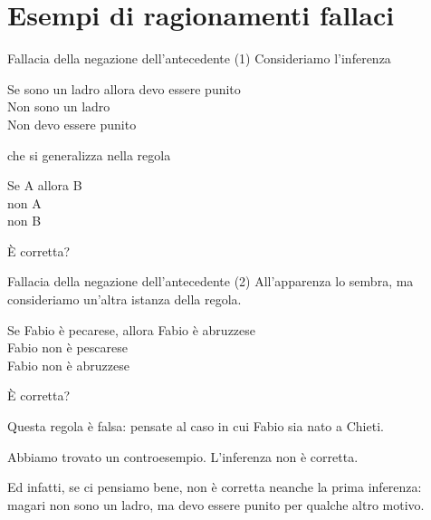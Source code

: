 \documentclass[10pt,dvipsnames]{beamer}
\begin{document}
\section{Esempi di ragionamenti fallaci}

\begin{frame}{Fallacia della negazione dell'antecedente (1)}
	Consideriamo l'inferenza
	\begin{center}
		\begin{inference}
			Se sono un ladro allora devo essere punito\\
			Non sono un ladro\\
			\hline
			Non devo essere punito
		\end{inference}
	\end{center}
	che si generalizza nella regola
	\begin{center}
		\begin{inference}
			Se A allora B\\
			non A\\
			\hline
			non B
		\end{inference}
	\end{center}
	È corretta?
\end{frame}

\begin{frame}{Fallacia della negazione dell'antecedente (2)}
	All'apparenza lo sembra, ma consideriamo un'altra istanza della regola.
	\begin{center}
		\begin{inference}
			Se Fabio è pecarese, allora Fabio è abruzzese \only<3->{\checkmark}\\
			Fabio non è pescarese \only<4->{\checkmark}\\
			\hline
			Fabio non è abruzzese \only<5->{\xmark}
		\end{inference}
	\end{center}
	È corretta?

	\pause
	\medskip
	Questa regola è falsa: pensate al caso in cui Fabio sia nato a Chieti.

	\medskip
	Abbiamo trovato un \alert{controesempio}. L'inferenza non è corretta.

	\medskip
	Ed infatti, se ci pensiamo bene, non è corretta neanche la prima inferenza: magari non sono un ladro, ma devo essere punito per qualche altro motivo.
\end{frame}
\end{document}
